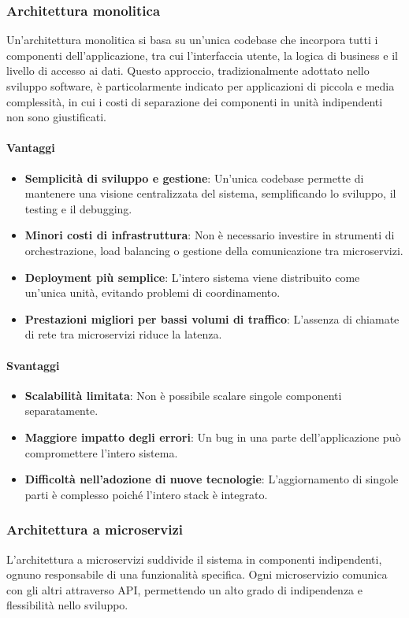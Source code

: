 \subsubsection{Architettura monolitica}
Un’architettura monolitica si basa su un’unica codebase che incorpora tutti i componenti dell’applicazione, tra cui l’interfaccia utente, la logica di business e il livello di accesso ai dati. Questo approccio, tradizionalmente adottato nello sviluppo software, è particolarmente indicato per applicazioni di piccola e media complessità, in cui i costi di separazione dei componenti in unità indipendenti non sono giustificati.
\paragraph{Vantaggi}  
\begin{itemize}
    \item \textbf{Semplicità di sviluppo e gestione}: Un’unica codebase permette di mantenere una visione centralizzata del sistema, semplificando lo sviluppo, il testing e il debugging.
    \item \textbf{Minori costi di infrastruttura}: Non è necessario investire in strumenti di orchestrazione, load balancing o gestione della comunicazione tra microservizi.
    \item \textbf{Deployment più semplice}: L’intero sistema viene distribuito come un’unica unità, evitando problemi di coordinamento.
    \item \textbf{Prestazioni migliori per bassi volumi di traffico}: L’assenza di chiamate di rete tra microservizi riduce la latenza.
\end{itemize}
\paragraph{Svantaggi}  
\begin{itemize}
    \item \textbf{Scalabilità limitata}: Non è possibile scalare singole componenti separatamente.
    \item \textbf{Maggiore impatto degli errori}: Un bug in una parte dell’applicazione può compromettere l’intero sistema.
    \item \textbf{Difficoltà nell’adozione di nuove tecnologie}: L’aggiornamento di singole parti è complesso poiché l’intero stack è integrato.
\end{itemize}

\subsubsection{Architettura a microservizi}
L’architettura a microservizi suddivide il sistema in componenti indipendenti, ognuno responsabile di una funzionalità specifica. Ogni microservizio comunica con gli altri attraverso API, permettendo un alto grado di indipendenza e flessibilità nello sviluppo.
